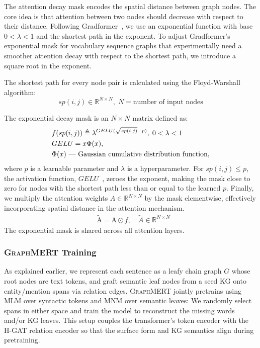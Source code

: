 \documentclass[10pt]{article}
\newcommand{\ours}{\textsc{GraphMERT}\xspace}
\begin{document}
The attention decay mask encodes the spatial distance between graph nodes. The core idea is that attention between two nodes should decrease with respect to their distance. Following Gradformer~\cite{gradformer}, we use an exponential function with base $0 < \lambda < 1$ and the shortest path in the exponent. To adjust Gradformer's exponential mask for vocabulary sequence graphs that experimentally need a smoother attention decay with respect to the shortest path, we introduce a square root in the exponent.

The shortest path for every node pair is calculated using the Floyd-Warshall algorithm:
\begin{equation}
sp(i, j) \in \mathbb{R}^{N \times N},\; N = \text{number of input nodes}
\end{equation}

The exponential decay mask is an $N \times N$ matrix defined as:
\begin{align}
& f(sp(i, j)) \triangleq \lambda^{GELU(\sqrt{sp(i, j)} - p)},\; 0<\lambda<1 \\
& GELU = x \Phi(x), \notag \\
& \Phi(x) \text{ --- Gaussian cumulative distribution function,} \notag
\end{align}
where $p$ is a learnable parameter and $\lambda$ is a hyperparameter. For $sp(i, j) \leq p$, the activation function, $GELU$~\cite{hendrycks2023gaussianerrorlinearunits}, zeroes the exponent, making the mask close to zero for nodes with the shortest path less than or equal to the learned $p$. Finally, we multiply the attention weights $A \in \mathbb{R}^{N \times N}$ by the mask elementwise, effectively incorporating spatial distance in the attention mechanism. 
\begin{align}
& \tilde{\text{A}} = \text{A} \odot f,\quad \tilde{A} \in \mathbb{R}^{N \times N}
\end{align}
The exponential mask is shared across all attention layers.

\subsubsection{\ours Training}
\label{subsubsec:graphmert_training}

As explained earlier, we represent each sentence as a leafy chain graph \(G\) whose root nodes are text tokens, and graft semantic leaf nodes from a seed KG onto entity/mention spans via relation edges. \ours jointly pretrains using MLM over syntactic tokens and MNM over semantic leaves: We randomly select spans in either space and train the model to reconstruct the missing words and/or KG leaves. This setup couples the transformer’s token encoder with the H-GAT relation encoder so that the surface form and KG semantics align during pretraining.
\end{document}
